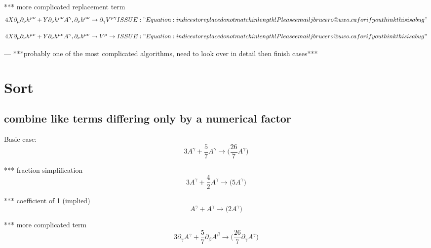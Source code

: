 \documentclass{article}
\def\){\Big)}
\def\({\Big(}
\begin{document}
{\color{red}
*** more complicated replacement term
\begin{equation}
4X \partial_{\mu} \partial_{\nu}h^{\mu \nu} +Y \partial_{\nu}h^{\mu \nu} A^{\gamma} ,  \partial_{\nu}h^{\mu \nu} \rightarrow \partial_{\gamma} V^{\mu \gamma}  ISSUE:" Equation: indices to replace do not match in length!
Please email jbrucero@uwo.ca for if you think this is a bug"
\end{equation}
}

{\color{red}
\begin{equation}
4X \partial_{\mu} \partial_{\nu}h^{\mu \nu} +Y \partial_{\nu}h^{\mu \nu} A^{\gamma} ,  \partial_{\nu}h^{\mu \nu} \rightarrow  V^{\mu} \rightarrow ISSUE:" Equation: indices to replace do not match in length!
Please email jbrucero@uwo.ca for if you think this is a bug"
\end{equation}
}


— ***probably one of the most complicated algorithms, need to look over in detail then finish cases***\\





\section{Sort}


\subsection{ combine like terms differing only by a numerical factor}

Basic case:
\begin{equation}
3A^{\gamma} + \frac{5}{7} A^{\gamma} \rightarrow 
\(\frac{26}{7} A^{\gamma} \)
\end{equation}

*** fraction simplification
\begin{equation}
3A^{\gamma} + \frac{4}{2} A^{\gamma}  \rightarrow 
\(5 A^{\gamma} \)
\end{equation}

*** coefficient of 1 (implied)
\begin{equation}
A^{\gamma} + A^{\gamma} \rightarrow 
\(2 A^{\gamma} \)
\end{equation}

*** more complicated term
\begin{equation}
3\partial_{\gamma}A^{\gamma} + \frac{5}{7} \partial_{\beta}A^{\beta} \rightarrow 
\(\frac{26}{7} \partial_{\gamma}A^{\gamma} \)
\end{equation}
\end{document}
